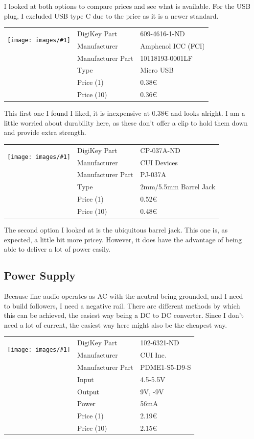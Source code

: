 \documentclass[a4paper]{article}
\makeatletter
\newenvironment{partdisplay}[1]{
\begin{center}
\begin{tabular}{@{}p{3cm}p{3cm}p{4.5cm}@{}}
\multirow{2}{3cm}{\texttt{[image: images/\#1]}}}{
\end{tabular}
\end{center}}
\makeatother
\begin{document}
I looked at both options to compare prices and see what is available. For the USB plug, I excluded USB type C due to the price as it is a newer standard.

\begin{partdisplay}{10118193-0001LF}
& DigiKey Part & 609-4616-1-ND\\
& Manufacturer & Amphenol ICC (FCI)\\
& Manufacturer Part & 10118193-0001LF\\
& Type & Micro USB\\
& Price (1) & 0.38€\\
& Price (10) & 0.36€\\
\end{partdisplay}

This first one I found I liked, it is inexpensive at 0.38€ and looks alright. I am a little worried about durability here, as these don't offer a clip to hold them down and provide extra strength.

\begin{partdisplay}{MFG_PJ-037A}
& DigiKey Part & CP-037A-ND\\
& Manufacturer & CUI Devices\\
& Manufacturer Part & PJ-037A\\
& Type & 2mm/5.5mm Barrel Jack\\
& Price (1) & 0.52€\\
& Price (10) & 0.48€\\
\end{partdisplay}

The second option I looked at is the ubiquitous barrel jack. This one is, as expected, a little bit more pricey. However, it does have the advantage of being able to deliver a lot of power easily.

\subsection{Power Supply}

Because line audio operates as AC with the neutral being grounded, and I need to build followers, I need a negative rail. There are different methods by which this can be achieved, the easiest way being a DC to DC converter. Since I don't need a lot of current, the easiest way here might also be the cheapest way.

\begin{partdisplay}{MFG_PDME1-S}
& DigiKey Part & 102-6321-ND\\
& Manufacturer & CUI Inc.\\
& Manufacturer Part & PDME1-S5-D9-S\\
& Input & 4.5-5.5V\\
& Output & 9V, -9V\\
& Power & 56mA\\
& Price (1) & 2.19€\\
& Price (10) & 2.15€\\
\end{partdisplay}
\end{document}
